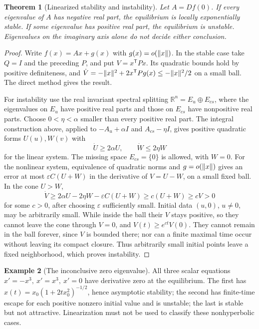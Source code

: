 \documentclass[11pt,oneside]{book}
\newtheorem{theorem}{Theorem}[chapter]
\theoremstyle{definition}
\newtheorem{example}[theorem]{Example}
\theoremstyle{remark}\newtheorem{remark}[theorem]{Remark}
\newcommand{\R}{\mathbb R}\newcommand{\C}{\mathbb C}
\begin{document}
\begin{theorem}[Linearized stability and instability]\label{d13:12:linearized-stability}
Let \(A=Df(0)\).
If every eigenvalue of \(A\) has negative real part, the equilibrium is
locally exponentially stable. If some eigenvalue has positive real part,
the equilibrium is unstable. Eigenvalues on the imaginary axis alone
do not decide either conclusion.
\end{theorem}
\begin{proof}
Write \(f(x)=Ax+g(x)\) with \(g(x)=o(\lVert x\rVert)\).
In the stable case take \(Q=I\) and the preceding \(P\), and put
\(V=x^{\mathsf T}Px\). Its quadratic bounds hold by positive
definiteness, and
\(\dot V=-\lVert x\rVert^2+2x^{\mathsf T}Pg(x)\le-\lVert x\rVert^2/2\)
on a small ball. The direct method gives the result.

For instability use the real invariant spectral splitting
\(\R^n=E_u\oplus E_{cs}\), where the eigenvalues on \(E_u\) have
positive real parts and those on \(E_{cs}\) have nonpositive real parts.
Choose \(0<\eta<\alpha\) smaller than every positive real part.
The integral construction above, applied to \(-A_u+\alpha I\) and
\(A_{cs}-\eta I\), gives positive quadratic forms \(U(u),W(v)\) with
\[
 \dot U\ge2\alpha U,\qquad \dot W\le2\eta W
\]
for the linear system. The missing space \(E_{cs}=\{0\}\) is allowed,
with \(W=0\). For the nonlinear system, equivalence of quadratic norms
and \(g=o(\lVert x\rVert)\) gives an error at most
\(\varepsilon C(U+W)\) in the derivative of \(V=U-W\), on a small
fixed ball. In the cone \(U>W\),
\[
 \dot V\ge2\alpha U-2\eta W-\varepsilon C(U+W)
          \ge c(U+W)\ge cV>0
\]
for some \(c>0\), after choosing \(\varepsilon\) sufficiently small.
Initial data \((u,0)\), \(u\ne0\), may be arbitrarily small.
While inside the ball their \(V\) stays positive, so they cannot leave
the cone through \(V=0\), and \(V(t)\ge e^{ct}V(0)\).
They cannot remain in the ball forever, since \(V\) is bounded there;
nor can a finite maximal time occur without leaving its compact closure.
Thus arbitrarily small initial points leave a fixed neighborhood,
which proves instability.
\end{proof}

\begin{example}[The inconclusive zero eigenvalue]\label{d13:12:zero-example}
All three scalar equations \(x'=-x^3,\ x'=x^3,\ x'=0\) have derivative
zero at the equilibrium. The first has
\(x(t)=x_0(1+2t x_0^2)^{-1/2}\), hence asymptotic stability; the second
has finite-time escape for each positive nonzero initial value and is
unstable; the last is stable but not attractive. Linearization must not
be used to classify these nonhyperbolic cases.
\end{example}
\end{document}
